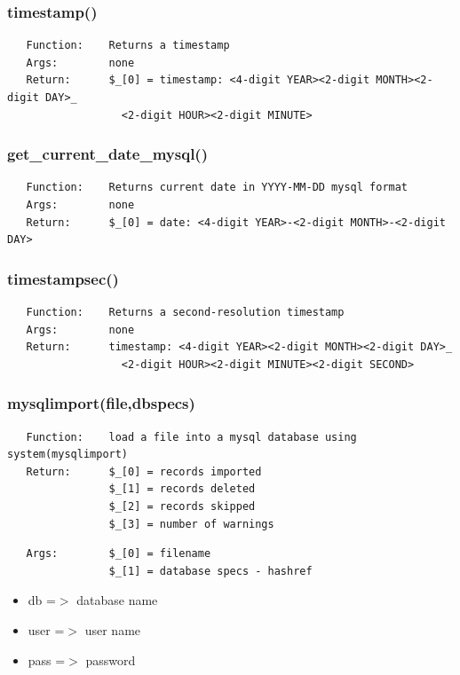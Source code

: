 \documentclass{article}
\begin{document}
\subsubsection*{timestamp()\label{pibase_pm_timestamp_}}
\begin{verbatim}
   Function:    Returns a timestamp
   Args:        none
   Return:      $_[0] = timestamp: <4-digit YEAR><2-digit MONTH><2-digit DAY>_
                  <2-digit HOUR><2-digit MINUTE>
\end{verbatim}
\subsubsection*{get\_current\_date\_mysql()\label{pibase_pm_get_current_date_mysql_}}
\begin{verbatim}
   Function:    Returns current date in YYYY-MM-DD mysql format
   Args:        none
   Return:      $_[0] = date: <4-digit YEAR>-<2-digit MONTH>-<2-digit DAY>
\end{verbatim}
\subsubsection*{timestampsec()\label{pibase_pm_timestampsec_}}
\begin{verbatim}
   Function:    Returns a second-resolution timestamp
   Args:        none
   Return:      timestamp: <4-digit YEAR><2-digit MONTH><2-digit DAY>_
                  <2-digit HOUR><2-digit MINUTE><2-digit SECOND>
\end{verbatim}
\subsubsection*{mysqlimport(file,dbspecs)\label{pibase_pm_mysqlimport_file_dbspecs_}}
\begin{verbatim}
   Function:    load a file into a mysql database using system(mysqlimport)
   Return:      $_[0] = records imported
                $_[1] = records deleted
                $_[2] = records skipped
                $_[3] = number of warnings
\end{verbatim}
\begin{verbatim}
   Args:        $_[0] = filename
                $_[1] = database specs - hashref
\end{verbatim}
\begin{itemize}

\item db =$>$ database name
\item user =$>$ user name
\item pass =$>$ password\end{itemize}
\end{document}
